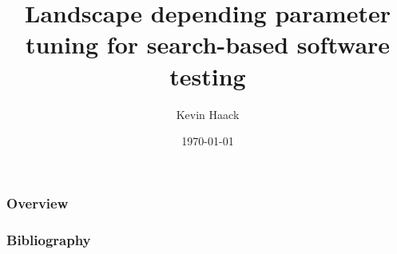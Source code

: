 \documentclass[aspectratio=169]{beamer}
\title{Landscape depending parameter
tuning for search-based software testing}
\subtitle{}
\author{Kevin Haack}
\institute{Software Engineering}
\date{\today}
\begin{document}
	
{
	\hnititlebackground 
	\begin{frame}
		\titlepage
	\end{frame}
}

{
	\begin{frame}
		\frametitle{Overview}
		\tableofcontents
	\end{frame}
}





{
	\begin{frame}
		\frametitle{Bibliography}
		
		
	\end{frame}
}


{
	\hnifullbackground 
	
	\begin{frame}
		\textbf{\Huge{\centerline{}}}
	\end{frame}
}
\end{document}
